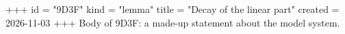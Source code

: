 +++
id = "9D3F"
kind = "lemma"
title = "Decay of the linear part"
created = 2026-11-03
+++
Body of 9D3F: a made-up statement about the model system.
